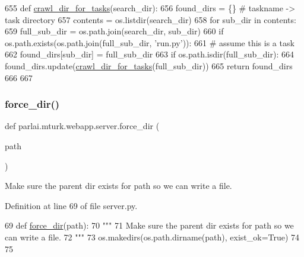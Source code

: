 \begin{DoxyCode}
655 \textcolor{keyword}{def }\hyperlink{namespaceparlai_1_1mturk_1_1webapp_1_1server_a0f5381b2282125d20fe12c40f6ed2ad3}{crawl\_dir\_for\_tasks}(search\_dir):
656     found\_dirs = \{\}  \textcolor{comment}{# taskname -> task directory}
657     contents = os.listdir(search\_dir)
658     \textcolor{keywordflow}{for} sub\_dir \textcolor{keywordflow}{in} contents:
659         full\_sub\_dir = os.path.join(search\_dir, sub\_dir)
660         \textcolor{keywordflow}{if} os.path.exists(os.path.join(full\_sub\_dir, \textcolor{stringliteral}{'run.py'})):
661             \textcolor{comment}{# assume this is a task}
662             found\_dirs[sub\_dir] = full\_sub\_dir
663         \textcolor{keywordflow}{if} os.path.isdir(full\_sub\_dir):
664             found\_dirs.update(\hyperlink{namespaceparlai_1_1mturk_1_1webapp_1_1server_a0f5381b2282125d20fe12c40f6ed2ad3}{crawl\_dir\_for\_tasks}(full\_sub\_dir))
665     \textcolor{keywordflow}{return} found\_dirs
666 
667 
\end{DoxyCode}
\mbox{\label{namespaceparlai_1_1mturk_1_1webapp_1_1server_a493aeecfa7d5201aa13a7f03cdbc59cf}} 
\subsubsection{\texorpdfstring{force\+\_\+dir()}{force\_dir()}}
{\footnotesize\ttfamily def parlai.\+mturk.\+webapp.\+server.\+force\+\_\+dir (\begin{DoxyParamCaption}\item[{}]{path }\end{DoxyParamCaption})}

\begin{DoxyVerb}Make sure the parent dir exists for path so we can write a file.
\end{DoxyVerb}
 

Definition at line 69 of file server.\+py.


\begin{DoxyCode}
69 \textcolor{keyword}{def }\hyperlink{namespaceparlai_1_1mturk_1_1webapp_1_1server_a493aeecfa7d5201aa13a7f03cdbc59cf}{force\_dir}(path):
70     \textcolor{stringliteral}{"""}
71 \textcolor{stringliteral}{    Make sure the parent dir exists for path so we can write a file.}
72 \textcolor{stringliteral}{    """}
73     os.makedirs(os.path.dirname(path), exist\_ok=\textcolor{keyword}{True})
74 
75 
\end{DoxyCode}
\mbox{\label{namespaceparlai_1_1mturk_1_1webapp_1_1server_aee065cfdb6346d4815762ae793427f1e}} 
